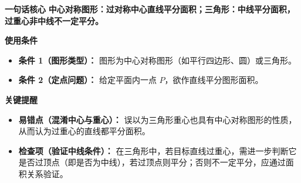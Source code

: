 \begin{summarybox}
	\textbf{\textcolor{CSummary}{一句话核心}}
	\textbf{中心对称图形：过对称中心直线平分面积；三角形：中线平分面积，过重心非中线不一定平分。}

	\medskip
	\textbf{\textcolor{CSummary}{使用条件}}
	\begin{itemize}[leftmargin=*, itemsep=0.5em, topsep=0.4em]
		\item \textbf{条件 1（图形类型）：} 图形为中心对称图形（如平行四边形、圆）或三角形。
		\item \textbf{条件 2（定点问题）：} 给定平面内一点 $P$，欲作直线平分图形面积。
	\end{itemize}

	\medskip
	\textbf{\textcolor{CSummary}{关键提醒}}
	\begin{itemize}[leftmargin=*, itemsep=0.5em, topsep=0.4em]
		\item \textbf{易错点（混淆中心与重心）：} 误以为三角形重心也具有中心对称图形的性质，从而认为过重心的直线都平分面积。
		\item \textbf{检查项（验证中线条件）：} 在三角形中，若目标直线过重心，需进一步判断它是否过顶点（即是否为中线），若过顶点则平分；否则不一定平分，应通过面积关系验证。
	\end{itemize}

\end{summarybox}
